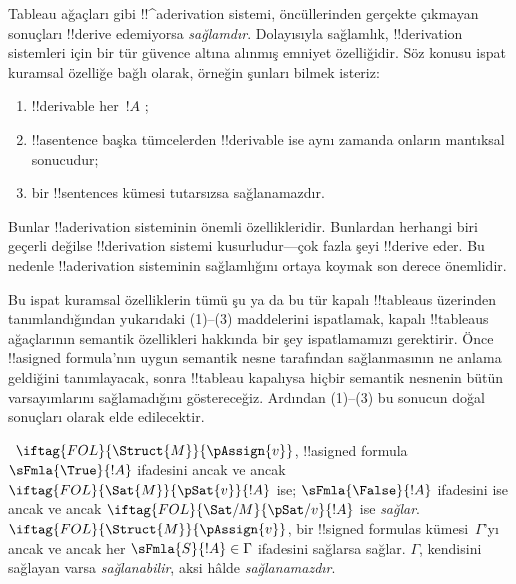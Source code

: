 

      {}
      {}
      

\begin{explain}
Tableau ağaçları gibi !!^a{derivation} sistemi, öncüllerinden gerçekte
çıkmayan sonuçları !!{derive} edemiyorsa \emph{sağlamdır}. Dolayısıyla sağlamlık,
!!{derivation} sistemleri için bir tür güvence altına alınmış emniyet
özelliğidir. Söz konusu ispat kuramsal özelliğe bağlı olarak, örneğin şunları
bilmek isteriz:
\begin{enumerate}
\item !!{derivable} her~$!A$ ;
\item !!a{sentence} başka tümcelerden !!{derivable} ise aynı zamanda onların
  mantıksal sonucudur;
\item bir !!{sentence}s kümesi tutarsızsa sağlanamazdır.
\end{enumerate}
Bunlar !!a{derivation} sisteminin önemli özellikleridir. Bunlardan herhangi
biri geçerli değilse !!{derivation} sistemi kusurludur---çok fazla şeyi
!!{derive} eder. Bu nedenle !!a{derivation} sisteminin sağlamlığını ortaya
koymak son derece önemlidir.

Bu ispat kuramsal özelliklerin tümü şu ya da bu tür kapalı !!{tableau}s
üzerinden tanımlandığından yukarıdaki (1)--(3) maddelerini ispatlamak, kapalı
!!{tableau}s ağaçlarının semantik özellikleri hakkında bir şey
ispatlamamızı gerektirir. Önce !!a{signed formula}'nın uygun semantik nesne
tarafından sağlanmasının ne anlama geldiğini tanımlayacak, sonra !!{tableau}
kapalıysa hiçbir semantik nesnenin bütün varsayımlarını sağlamadığını göstereceğiz. Ardından
(1)--(3) bu sonucun doğal sonuçları olarak elde edilecektir.
\end{explain}

\begin{defn}
~$\iftag{FOL}{\Struct{M}}{\pAssign{v}}$,
!!a{signed formula} $\sFmla{\True}{!A}$ ifadesini ancak ve ancak
$\iftag{FOL}{\Sat{M}}{\pSat{v}}{!A}$ ise; $\sFmla{\False}{!A}$ ifadesini
ise ancak ve ancak $\iftag{FOL}{\Sat/{M}}{\pSat/{v}}{!A}$ ise
\emph{sağlar}. $\iftag{FOL}{\Struct{M}}{\pAssign{v}}$, bir !!{signed
formula}s kümesi~$\Gamma$'yı ancak ve ancak her
$\sFmla{S}{!A} \in \Gamma$ ifadesini sağlarsa sağlar. $\Gamma$, kendisini
sağlayan  varsa
\emph{sağlanabilir}, aksi hâlde \emph{sağlanamazdır}.
\end{defn}


